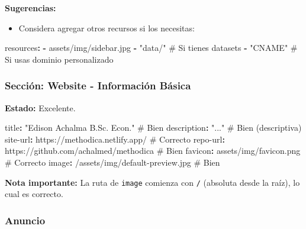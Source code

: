 \documentclass[
  doc,
  floatsintext,
  longtable,
  a4paper,
  nolmodern,
  notxfonts,
  notimes,
  12pt,
  colorlinks=true,linkcolor=blue,citecolor=blue,urlcolor=blue]{apa7}
\newenvironment{Shaded}{\begin{snugshade}}{\end{snugshade}}
\newcommand{\AttributeTok}[1]{\textcolor[rgb]{0.40,0.45,0.13}{#1}}
\newcommand{\CommentTok}[1]{\textcolor[rgb]{0.37,0.37,0.37}{#1}}
\newcommand{\FunctionTok}[1]{\textcolor[rgb]{0.28,0.35,0.67}{#1}}
\newcommand{\KeywordTok}[1]{\textcolor[rgb]{0.00,0.23,0.31}{\textbf{#1}}}
\newcommand{\StringTok}[1]{\textcolor[rgb]{0.13,0.47,0.30}{#1}}
\providecommand{\tightlist}{%
  \setlength{\itemsep}{0pt}\setlength{\parskip}{0pt}}
\begin{document}
\textbf{Sugerencias:}

\begin{itemize}
\tightlist
\item
  Considera agregar otros recursos si los necesitas:
\end{itemize}

\begin{Shaded}
\begin{Highlighting}[]
\FunctionTok{resources}\KeywordTok{:}
\AttributeTok{  }\KeywordTok{{-}}\AttributeTok{ assets/img/sidebar.jpg}
\AttributeTok{  }\KeywordTok{{-}}\AttributeTok{ }\StringTok{"data/"}\CommentTok{                          \# Si tienes datasets}
\AttributeTok{  }\KeywordTok{{-}}\AttributeTok{ }\StringTok{"CNAME"}\CommentTok{                          \# Si usas dominio personalizado}
\end{Highlighting}
\end{Shaded}

\subsubsection{Sección: Website - Información
Básica}\label{secciuxf3n-website---informaciuxf3n-buxe1sica}

\textbf{Estado:} Excelente.

\begin{Shaded}
\begin{Highlighting}[]
\FunctionTok{title}\KeywordTok{:}\AttributeTok{ }\StringTok{"Edison Achalma B.Sc. Econ."}\CommentTok{              \# Bien}
\FunctionTok{description}\KeywordTok{:}\AttributeTok{ }\StringTok{"..."}\CommentTok{                                \# Bien (descriptiva)}
\FunctionTok{site{-}url}\KeywordTok{:}\AttributeTok{ https://methodica.netlify.app/}\CommentTok{         \# Correcto}
\FunctionTok{repo{-}url}\KeywordTok{:}\AttributeTok{ https://github.com/achalmed/methodica}\CommentTok{  \# Bien}
\FunctionTok{favicon}\KeywordTok{:}\AttributeTok{ assets/img/favicon.png}\CommentTok{                  \# Correcto}
\FunctionTok{image}\KeywordTok{:}\AttributeTok{ /assets/img/default{-}preview.jpg}\CommentTok{           \# Bien}
\end{Highlighting}
\end{Shaded}

\textbf{Nota importante:} La ruta de \texttt{image} comienza con
\texttt{/} (absoluta desde la raíz), lo cual es correcto.

\subsubsection{Anuncio}\label{anuncio}
\end{document}
